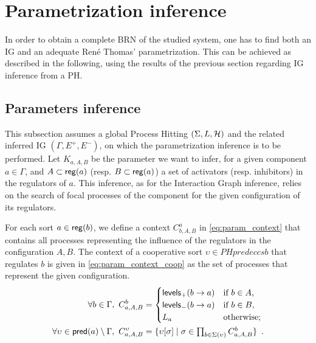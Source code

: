 \section{Parametrization inference}


In order to obtain a complete BRN of the studied system, one has to find both an IG and an adequate René Thomas' parametrization. This can be achieved as described in the following, using the results of the previous section regarding IG inference from a PH.

\subsection{Parameters inference}
This subsection assumes a global Process Hitting $(\Sigma,L,\mathcal{H})$ and the related inferred IG $(\Gamma, E^+, E^-)$, on which the parametrization inference is to be performed.
Let $K_{a,A,B}$ be the parameter we want to infer, for a given component $a \in \Gamma$, and $A \subset \mathsf{reg}({a})$ (resp. $B \subset \mathsf{reg}({a})$)  a set of activators (resp. inhibitors) in the regulators of $a$.
This inference, as for the Interaction Graph inference, relies on the search of focal processes of the component for the given configuration of its regulators.

For each sort $a \in \mathsf{reg}({b})$, we define a context $C^a_{b,A,B}$ in \eqref{eq:param_context} that contains all processes representing the influence of the regulators in the configuration $A,B$.
The context of a cooperative sort $\upsilon \in PHpredeccs{b}$ that regulates $b$ is given in \eqref{eq:param_context_coop} as the set of processes that represent the given configuration.
\begin{align}
\label{eq:param_context}
\forall b\in\Gamma,~
C_{a,A,B}^b & = \begin{cases}
\mathsf{levels}_+(b\rightarrow a) & \text{if $b \in A$,}\\
\mathsf{levels}_-(b\rightarrow a) & \text{if $b \in B$,}\\
L_a		& \text{otherwise;}\\
\end{cases}
\\
\label{eq:param_context_coop}
\forall \upsilon \in \mathsf{pred}(a)\setminus\Gamma,~
C_{a,A,B}^\upsilon & = \{
\upsilon[\sigma] \mid \sigma \in \textstyle\prod_{b \in \Sigma(\upsilon)}C_{a,A,B}^b \}
\enspace.
\end{align}


